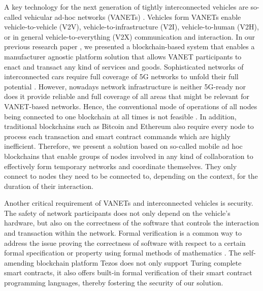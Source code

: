 \documentclass{llncs}
\begin{document}
{		A key technology for the next generation of tightly interconnected vehicles are so-called vehicular ad-hoc networks (VANETs) \cite{bibid}. Vehicles form VANETs enable vehicle-to-vehicle (V2V), vehicle-to-infrastructure (V2I), vehicle-to-human (V2H), or in general vehicle-to-everything (V2X) communication and interaction. In our previous research paper \cite{our-own-paper}\cite{something-for-V2whatever}\cite{bibid}, we presented a blockchain-based system that enables a manufacturer agnostic platform solution that allows VANET participants to enact and transact any kind of services and goods. Sophisticated networks of interconnected cars require full coverage of 5G networks to unfold their full potential \cite{bibid}. However, nowadays network infrastructure is neither 5G-ready nor does it provide reliable and full coverage of all areas that might be relevant for VANET-based networks. Hence, the conventional mode of operations of all nodes being connected to one blockchain at all times is not feasible \cite{bibid}. In addition, traditional blockchains such as Bitcoin \cite{nakamoto_bitcoin:2008} and Ethereum \cite{wood2014ethereum} also require every node to process each transaction and smart contract commands which are highly inefficient. Therefore, we present a solution based on so-called mobile ad hoc blockchains that enable groups of nodes involved in any kind of collaboration to effectively form temporary networks and coordinate themselves. They only connect to nodes they need to be connected to, depending on the context, for the duration of their interaction.
		
		Another critical requirement of VANETs and interconnected vehicles is security. The safety of network participants does not only depend on the vehicle's hardware, but also on the correctness of the software that controls the interaction and transaction within the network. Formal verification is a common way to address the issue proving the correctness of software with respect to a certain formal specification or property using formal methods of mathematics \cite{bibid}\cite{bibid}. The self-amending blockchain platform Tezos \cite{tezosWhitepaper} does not only support Turing complete smart contracts, it also offers built-in formal verification of their smart contract programming languages, thereby fostering the security of our solution.






}
\end{document}
